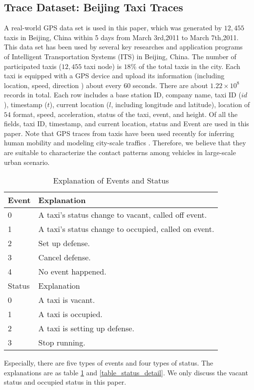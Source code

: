 \subsection{Trace Dataset: Beijing Taxi Traces}
\label{section_trace_data}

A real-world GPS data set is used in this paper, which was generated by $12,455$ taxis in Beijing, China within 5 days from March 3rd,2011 to March 7th,2011. This data set has been used by several key researches and application programs of Intelligent Transportation Systems (ITS) in Beijing, China. The number of participated taxis ($12,455$ taxi node) is $18\%$ of the total taxis in the city. Each taxi is equipped with a GPS device and upload its information (including location, speed, direction ) about every 60 seconds. There are about $1.22 \times 10^8$ records in total.
Each row includes a base station ID, company name, taxi ID ($id$), timestamp ($t$), current location ($l$, including longitude and latitude), location of $54$ format, speed, acceleration, status of the taxi, event, and height. Of all the fields, taxi ID, timestamp, and current location, status and Event are used in this paper.  Note that GPS traces from taxis have been used recently for inferring human mobility \cite{Ganti} and modeling city-scale traffics \cite{Aslam}. Therefore, we believe that they are suitable to characterize the contact patterns among vehicles in large-scale urban scenario.

\begin{table}[!t]
\caption{Explanation of Events and Status}\label{table_event_detail}
\centering
\begin{tabular}{l|l}
  \hline
  Event & Explanation \\
  \hline
  0 & A taxi's status change to vacant, called off event.\\
  \hline
  1 & A taxi's status change to occupied, called on event.\\
  \hline
  2 & Set up defense.\\
  \hline
  3 & Cancel defense.\\
  \hline
  4 & No event happened.\\
  \hline
  \hline
  Status & Explanation \\
  \hline
0 & A taxi is vacant. \\
    \hline
1 & A taxi is occupied. \\
    \hline
2 & A taxi is setting up defense. \\
    \hline
3 & Stop running.\\
  \hline
\end{tabular}
\end{table}


Especially, there are five types of events and four types of status. The explanations are as table \ref{table_event_detail} and \ref{table_status_detail}. We only discuss the vacant status and occupied status in this paper.






